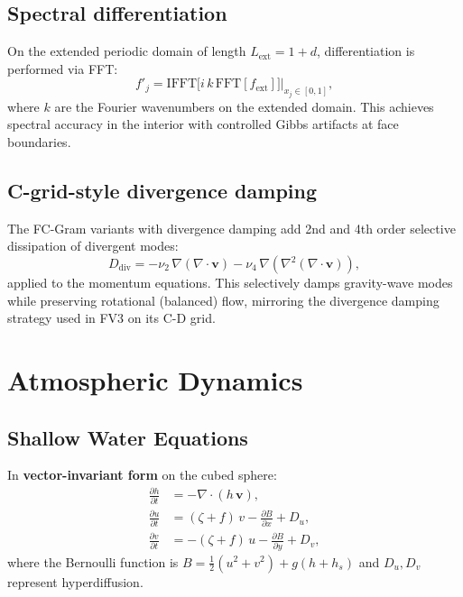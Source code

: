 \documentclass[11pt,a4paper]{article}
\newcommand{\pp}{\partial}
\newcommand{\half}{\tfrac{1}{2}}
\begin{document}
\subsection{Spectral differentiation}
On the extended periodic domain of length $L_{\mathrm{ext}}=1+d$, differentiation is performed via FFT:
\begin{equation}
  f'_j = \mathrm{IFFT}\bigl[i\,k\,\mathrm{FFT}[f_{\mathrm{ext}}]\bigr]\bigg|_{x_j\in[0,1]},
\end{equation}
where $k$ are the Fourier wavenumbers on the extended domain.  This achieves spectral accuracy in the interior with controlled Gibbs artifacts at face boundaries.

\subsection{C-grid-style divergence damping}
The FC-Gram variants with divergence damping add 2nd and 4th order selective dissipation of divergent modes:
\begin{equation}
  D_{\mathrm{div}} = -\nu_2\,\nabla(\nabla\!\cdot\!\bm v) - \nu_4\,\nabla(\nabla^2(\nabla\!\cdot\!\bm v)),
\end{equation}
applied to the momentum equations.  This selectively damps gravity-wave modes while preserving rotational (balanced) flow, mirroring the divergence damping strategy used in FV3 on its C-D grid.

\section{Atmospheric Dynamics}

\subsection{Shallow Water Equations}

In \textbf{vector-invariant form} on the cubed sphere:
\begin{align}
  \frac{\pp h}{\pp t} &= -\nabla\!\cdot\!(h\,\bm v), \label{eq:sw-mass}\\
  \frac{\pp u}{\pp t} &= (\zeta+f)\,v - \frac{\pp B}{\pp x} + D_u, \label{eq:sw-u}\\
  \frac{\pp v}{\pp t} &= -(\zeta+f)\,u - \frac{\pp B}{\pp y} + D_v, \label{eq:sw-v}
\end{align}
where the Bernoulli function is $B=\half(u^2+v^2)+g(h+h_s)$ and $D_u,D_v$ represent hyperdiffusion.
\end{document}

